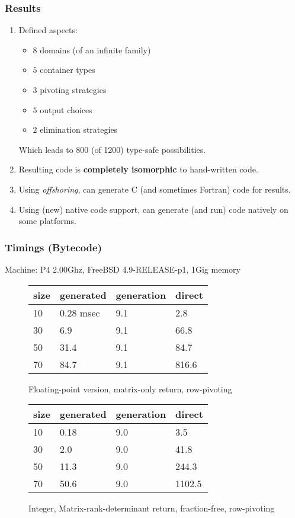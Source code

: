 \documentclass{beamer}
\begin{document}
\begin{frame}
    \frametitle{Results}
    \begin{enumerate}
        \item Defined aspects:
    \begin{itemize}
        \item $8$ domains (of an infinite family)
        \item $5$ container types
        \item $3$ pivoting strategies 
        \item $5$ output choices 
        \item $2$ elimination strategies
    \end{itemize}
Which leads to 800 (of 1200) type-safe possibilities.

\item Resulting code is \textbf{completely isomorphic} to hand-written code.

\item Using \emph{offshoring}, can generate C (and sometimes Fortran) code
for results.

\item Using (new) native code support, can generate (and run) code
    natively on some platforms.
    \end{enumerate}
\end{frame}

\begin{frame}
\frametitle{Timings (Bytecode)}
Machine: P4 2.00Ghz, FreeBSD 4.9-RELEASE-p1, 1Gig memory
\begin{figure}
\begin{tabular}{l|l|l|l}
    size & generated & generation & direct \\ \hline
    10 & 0.28 msec & 9.1 & 2.8 \\
    30 & 6.9  & 9.1 & 66.8 \\
    50 & 31.4 & 9.1 & 84.7 \\
    70 & 84.7 & 9.1 & 816.6 \\
\end{tabular}
\caption{Floating-point version, matrix-only return, row-pivoting}
\end{figure}

\begin{figure}
\begin{tabular}{l|l|l|l}
    size & generated & generation & direct \\ \hline
    10 & 0.18 & 9.0 & 3.5 \\
    30 & 2.0  & 9.0 & 41.8 \\
    50 & 11.3 & 9.0 & 244.3 \\
    70 & 50.6 & 9.0 & 1102.5 \\
\end{tabular}
\caption{Integer, Matrix-rank-determinant return, fraction-free, row-pivoting}
\end{figure}
\end{frame}
\end{document}
